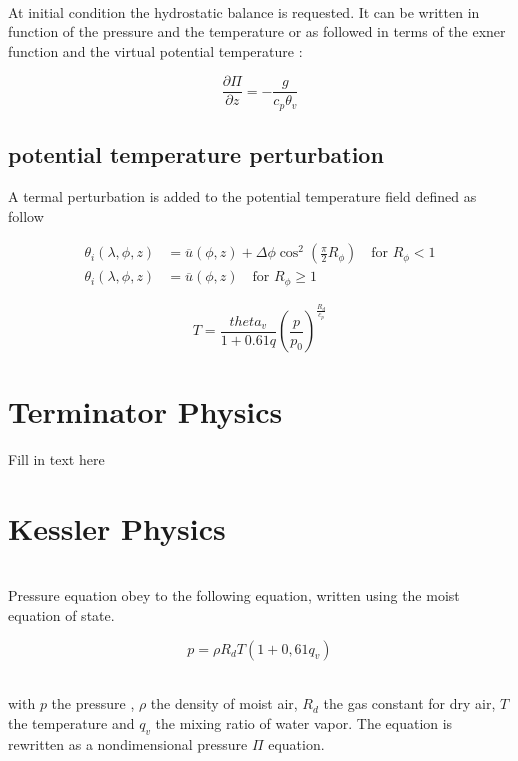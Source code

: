 \documentclass[times,doublespace]{fldauth}
\begin{document}
~\\ At initial condition the hydrostatic balance is requested. It can be written in function of the pressure and the temperature or as followed in terms of the exner function and the virtual potential temperature :

  \begin{equation}
 \frac{\partial{\Pi}}{\partial z} = - \frac{g}{c_p\theta_v}
 \end {equation}



\subsection{potential temperature perturbation}

A termal perturbation is added to the potential temperature field defined as follow

\begin{equation}
\begin{split}
\theta_i(\lambda,\phi,z)&=\overline{u}(\phi,z) + \Delta\phi\cos^2\left(\frac{\pi}{2}R_{\phi}\right) \text{ ~~for   } R_{\phi} < 1 \\
\theta_i(\lambda,\phi,z)&=\overline{u}(\phi,z) \text{ ~~for   } R_{\phi} \geq 1
\end{split}
\end{equation}


 \begin{equation}
T=\frac{theta_v}{1+0.61q}\left(\frac{p}{p_0}\right)^{\frac{R_d}{c_p}}
\end{equation}

\clearpage
\section{Terminator Physics}

{\color{red}Fill in text here}

\clearpage
\section{Kessler Physics}

~\\Pressure equation obey to the following equation, written using the moist equation of state.

\begin{equation}
p=\rho R_dT(1+0,61q_v)
\end{equation}

~\\ with $p$ the pressure , $\rho$ the density of moist air, $R_d$ the gas constant for dry air, $T$ the temperature and $q_v$ the mixing ratio of water vapor. The equation is rewritten as a nondimensional pressure $\Pi$ equation.
\end{document}
